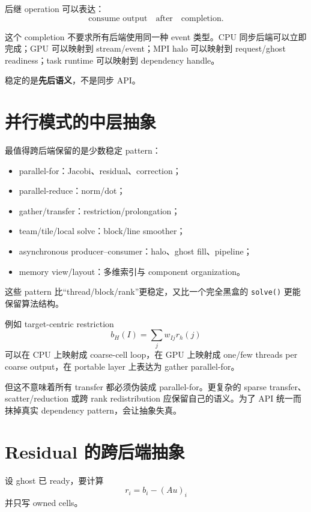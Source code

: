 后继 operation 可以表达：
\begin{equation}
\text{consume output}
\quad\text{after}\quad
\text{completion}.
\end{equation}

这个 completion 不要求所有后端使用同一种 event 类型。CPU 同步后端可以立即完成；GPU 可以映射到 stream/event；MPI halo 可以映射到 request/ghost readiness；task runtime 可以映射到 dependency handle。

稳定的是\textbf{先后语义}，不是同步 API。

\section{并行模式的中层抽象}

最值得跨后端保留的是少数稳定 pattern：

\begin{itemize}
\item parallel-for：Jacobi、residual、correction；
\item parallel-reduce：norm/dot；
\item gather/transfer：restriction/prolongation；
\item team/tile/local solve：block/line smoother；
\item asynchronous producer--consumer：halo、ghost fill、pipeline；
\item memory view/layout：多维索引与 component organization。
\end{itemize}

这些 pattern 比“thread/block/rank”更稳定，又比一个完全黑盒的 \texttt{solve()} 更能保留算法结构。

例如 target-centric restriction
\begin{equation}
b_H(I)
=
\sum_j w_{Ij}r_h(j)
\end{equation}
可以在 CPU 上映射成 coarse-cell loop，在 GPU 上映射成 one/few threads per coarse output，在 portable layer 上表达为 gather parallel-for。

但这不意味着所有 transfer 都必须伪装成 parallel-for。更复杂的 sparse transfer、scatter/reduction 或跨 rank redistribution 应保留自己的语义。为了 API 统一而抹掉真实 dependency pattern，会让抽象失真。

\section{Residual 的跨后端抽象}
\label{sec:portability-residual-trace}

设 ghost 已 ready，要计算
\begin{equation}
r_i
=
b_i-(Au)_i
\end{equation}
并只写 owned cells。

